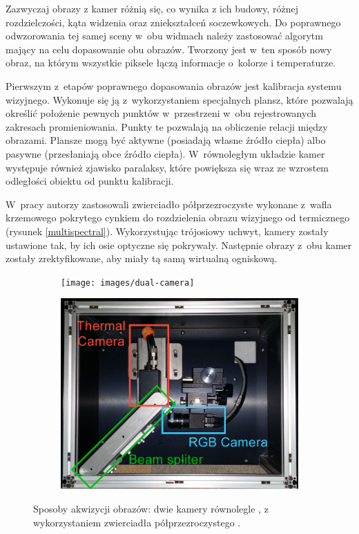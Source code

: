 Zazwyczaj obrazy z kamer różnią się, co wynika z ich budowy, różnej rozdzielczości, kąta widzenia oraz zniekształceń soczewkowych.
Do poprawnego odwzorowania tej samej sceny w~obu widmach należy zastosować algorytm mający na celu dopasowanie obu obrazów.
Tworzony jest w~ten sposób nowy obraz, na którym wszystkie piksele łączą informacje o~kolorze i temperaturze.

Pierwszym z~etapów poprawnego dopasowania obrazów jest kalibracja systemu wizyjnego.
Wykonuje się ją z~wykorzystaniem specjalnych plansz, które pozwalają określić położenie pewnych punktów w~przestrzeni w~obu rejestrowanych zakresach promieniowania.
Punkty te pozwalają na obliczenie relacji między obrazami.
Plansze mogą być aktywne (posiadają własne źródło ciepła) albo pasywne (przesłaniają obce źródło ciepła).
W~równoległym układzie kamer występuje również zjawisko paralaksy, które powiększa się wraz ze wzrostem odległości obiektu od punktu kalibracji. %

W~pracy \cite{hwang2015multispectral} autorzy zastosowali zwierciadło półprzezroczyste wykonane z~wafla krzemowego pokrytego cynkiem do rozdzielenia obrazu wizyjnego od termicznego (rysunek \ref{multispectral}). 
Wykorzystując trójosiowy uchwyt, kamery zostały ustawione tak, by ich osie optyczne się pokrywały. 
Następnie obrazy z~obu kamer zostały zrektyfikowane, aby miały tą samą wirtualną ogniskową.

\begin{figure}[h]
\centering
\begin{subfigure}{0.45\textwidth}
\centering
\texttt{[image: images/dual-camera]}
\subcaption{\label{dual_camera}}
\end{subfigure}
\begin{subfigure}{0.45\textwidth}
\centering
\includegraphics[width=1\textwidth]{images/multispectral}
\subcaption{\label{multispectral}}
\end{subfigure}
\caption{\label{fig:cameras_systems}Sposoby akwizycji obrazów: \protect{} dwie kamery równolegle \cite{lee2015robust}, \protect{} z wykorzystaniem zwierciadła półprzezroczystego \cite{hwang2015multispectral}.}
\end{figure}


